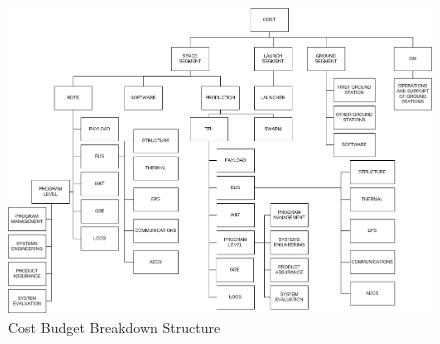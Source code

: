\begin{figure}[ht!]
\begin{center}

\includegraphics[height=0.8\textwidth,angle=90]{chapters/img/costbreakdown.jpg}
\caption{Cost Budget Breakdown Structure}
\label{fig:costbreak}
\end{center}
\end{figure}


